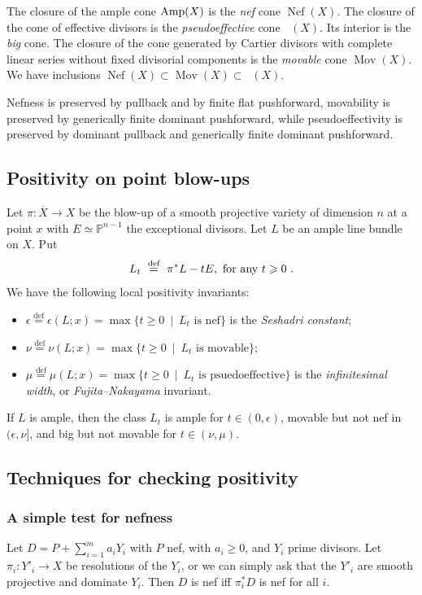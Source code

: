 \documentclass[12pt]{amsart}
\theoremstyle{definition}
\newcommand{\PP}{\ensuremath{\mathbb{P}}}
\renewcommand{\geq}{\geqslant}
\DeclareMathOperator{\Nef}{Nef}
\DeclareMathOperator{\Eff}{\overline{Eff}}
\DeclareMathOperator{\Mov}{Mov}
\newcommand{\deq}{\ensuremath{\stackrel{\textrm{def}}{=}}}
\newcommand{\?}{ \circled{{\large\bf ?}}}
\begin{document}
The closure of the ample cone ${\rm Amp}(X)$ is the \emph{nef} cone $\Nef(X)$. The closure of the cone of effective divisors is the \emph{pseudoeffective} cone $\Eff(X)$. Its interior is the \emph{big} cone. The closure of the cone generated by Cartier divisors with complete linear series without fixed divisorial components is the \emph{movable} cone $\Mov(X)$. We have inclusions $\Nef(X)\subset\Mov(X)\subset\Eff(X)$.

Nefness is preserved by pullback and by finite flat pushforward, movability is preserved by generically finite dominant pushforward, while pseudoeffectivity is preserved by dominant pullback and generically finite dominant pushforward.

\subsection{Positivity on point blow-ups}
Let $\pi:\overline{X}\rightarrow X$ be the blow-up of a smooth projective variety of dimension $n$ at a point $x$ with $E\simeq \PP^{n-1}$ the exceptional divisors. Let $L$ be an ample line bundle on $X$. Put 
\[
L_t \ \deq \ \pi^*L-tE, \textup{ for any } t\geq 0 \ .
\]
We have the following local positivity invariants: 
\begin{itemize}
	\item $\epsilon\deq \epsilon(L;x)=\max\{t\geq 0\ \mid\ L_t\text{ is nef}\}$ is the \textit{Seshadri constant}; 
	\item $\nu\deq\nu(L;x)=\max\{t\geq 0\ \mid\ L_t\text{ is movable}\}$; 
	\item $\mu\deq \mu(L;x)=\max\{t\geq 0\ \mid\ L_t\text{ is psuedoeffective}\}$ is the \emph{infinitesimal width}, or \emph{Fujita--Nakayama} invariant. 
\end{itemize} If $L$ is ample, then the class $L_t$ is ample for $t\in (0,\epsilon)$, movable but not nef in $(\epsilon,\nu]$, and big but not movable for $t\in (\nu, \mu)$.

\subsection{Techniques for checking positivity}

\subsubsection{A simple test for nefness}\label{subsec:neftest} Let $D=P+\sum_{i=1}^ma_iY_i$ with $P$ nef, with $a_i\geq 0$, and $Y_i$ prime divisors. Let $\pi_i:Y'_i\to X$ be resolutions of the $Y_i$, or we can simply ask that the $Y'_i$ are smooth projective and dominate $Y_i$. Then $D$ is nef iff $\pi_i^*D$ is nef for all $i$.
\end{document}
